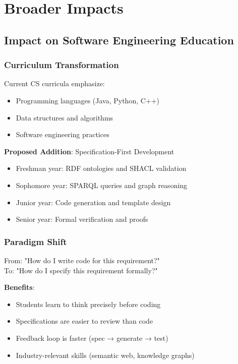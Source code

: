 \section{Broader Impacts}

\subsection{Impact on Software Engineering Education}

\subsubsection{Curriculum Transformation}

Current CS curricula emphasize:
\begin{itemize}
    \item Programming languages (Java, Python, C++)
    \item Data structures and algorithms
    \item Software engineering practices
\end{itemize}

\textbf{Proposed Addition}: Specification-First Development
\begin{itemize}
    \item Freshman year: RDF ontologies and SHACL validation
    \item Sophomore year: SPARQL queries and graph reasoning
    \item Junior year: Code generation and template design
    \item Senior year: Formal verification and proofs
\end{itemize}

\subsubsection{Paradigm Shift}

From: "How do I write code for this requirement?" \\
To: "How do I specify this requirement formally?"

\textbf{Benefits}:
\begin{itemize}
    \item Students learn to think precisely before coding
    \item Specifications are easier to review than code
    \item Feedback loop is faster (spec → generate → test)
    \item Industry-relevant skills (semantic web, knowledge graphs)
\end{itemize}

